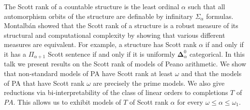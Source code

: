 \documentclass[bsl,meeting]{asl}
\newcommand{\NP}{}
\begin{document}
\thispagestyle{empty}


\NP  
{}


The Scott rank of a countable structure is the least ordinal $\alpha$ such that all
automorphism orbits of the structure are definable by infinitary
$\Sigma_{\alpha}$ formulas. Montalb\'an showed that the Scott rank of
a structure is a robust measure of its structural and computational complexity
by showing that
various different measures are equivalent. For example, a structure has
Scott rank $\alpha$ if and only if it has a $\Pi_{\alpha+1}$ Scott sentence if
and only if it is uniformly $\pmb \Delta_\alpha^0$ categorical.
In this talk we present results on the Scott rank of models of Peano arithmetic. We show that 
non-standard models of PA have Scott rank at least $\omega$ and that the 
models of PA that have Scott rank $\omega$ are precisely the prime models. We also give
reductions via bi-interpretability of the class of linear orders
to completions $T$ of $PA$. This allows us to exhibit models of $T$ of Scott rank $\alpha$ for every $\omega\leq \alpha\leq \omega_1$.
\end{document}
